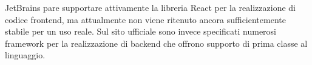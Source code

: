       JetBrains pare supportare attivamente la libreria React per la realizzazione di codice frontend, ma attualmente non viene ritenuto ancora sufficientemente stabile per un uso reale.
      Sul sito ufficiale sono invece specificati numerosi framework per la realizzazione di backend che offrono supporto di prima classe al linguaggio.
